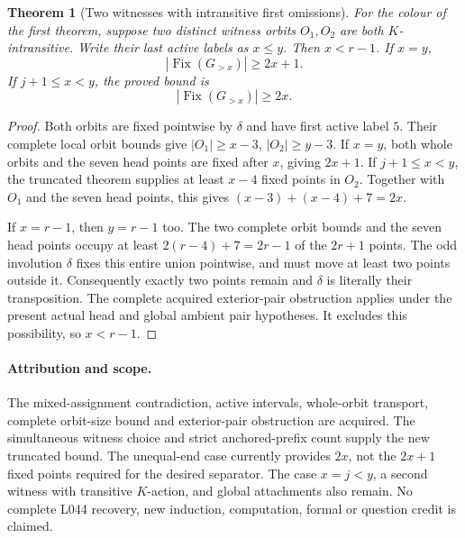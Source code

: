 \documentclass[11pt,a4paper]{article}
\newtheorem{theorem}[lemma]{Theorem}
\begin{document}
\begin{theorem}[Two witnesses with intransitive first omissions]
For the colour of the first theorem, suppose two
distinct witness orbits $O_1,O_2$ are both
$K$-intransitive. Write their last active labels
as $x\le y$. Then $x<r-1$. If $x=y$,
\[
                   |\operatorname{Fix}(G_{>x})|\ge2x+1.
\]
If $j+1\le x<y$, the proved bound is
\[
                   |\operatorname{Fix}(G_{>x})|\ge2x.
\]
\end{theorem}
\begin{proof}
Both orbits are fixed pointwise by $\delta$ and
have first active label $5$. Their complete local
orbit bounds give $|O_1|\ge x-3$, $|O_2|\ge y-3$.
If $x=y$, both whole orbits and the seven head
points are fixed after $x$, giving $2x+1$.
If $j+1\le x<y$, the truncated theorem supplies
at least $x-4$ fixed points in $O_2$. Together
with $O_1$ and the seven head points, this gives
$(x-3)+(x-4)+7=2x$.

If $x=r-1$, then $y=r-1$ too. The two complete
orbit bounds and the seven head points occupy
at least $2(r-4)+7=2r-1$ of the $2r+1$ points.
The odd involution $\delta$ fixes this entire
union pointwise, and must move at least two
points outside it. Consequently exactly two
points remain and $\delta$ is literally their
transposition. The complete acquired exterior-pair
obstruction applies under the present actual
head and global ambient pair hypotheses. It
excludes this possibility, so $x<r-1$.
\end{proof}

\paragraph{Attribution and scope.}
The mixed-assignment contradiction, active intervals,
whole-orbit transport, complete orbit-size bound and
exterior-pair obstruction are acquired. The simultaneous
witness choice and strict anchored-prefix count supply
the new truncated bound. The unequal-end case currently
provides $2x$, not the $2x+1$ fixed points required for
the desired separator. The case $x=j<y$, a second
witness with transitive $K$-action, and global attachments
also remain. No complete L044 recovery, new induction,
computation, formal or question credit is claimed.
\end{document}
